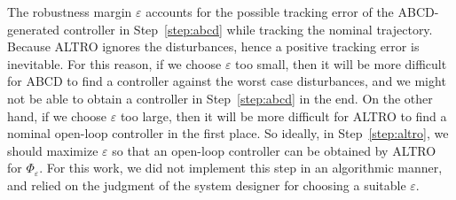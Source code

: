 The robustness margin $\varepsilon$ accounts for the possible tracking error of the ABCD-generated controller in Step~\ref{step:abcd} while tracking the nominal trajectory.
Because ALTRO ignores the disturbances, hence a positive tracking error is inevitable.
For this reason, if we choose $\varepsilon$ too small, then it will be more difficult for ABCD to find a controller against the worst case disturbances, and we might not be able to obtain a controller in Step~\ref{step:abcd} in the end.
On the other hand, if we choose $\varepsilon$ too large, then it will be more difficult for ALTRO to find a nominal open-loop controller in the first place.
So ideally, in Step~\ref{step:altro}, we should maximize $\varepsilon$ so that an open-loop controller can be obtained by ALTRO for $\Phi_\varepsilon$.
For this work, we did not implement this step in an algorithmic manner, and relied on the judgment of the system designer for choosing a suitable $\varepsilon$.